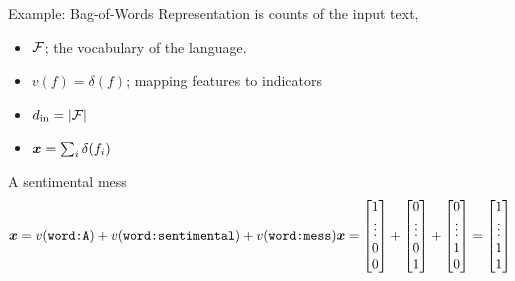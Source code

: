 \documentclass{beamer}
\begin{document}
\begin{frame}{Example: Bag-of-Words}
  Representation is counts of the input text, 
  \begin{itemize}
  \item $\mathcal{F}$; the vocabulary of the language.
  \item $v(f) = \delta(f)$; mapping features to indicators
  \item $d_{\mathrm{in}} = |\mathcal{F}|$
  \item $\boldsymbol{x} = \sum_{i} \delta(f_i)$ 
  \end{itemize}

  A sentimental mess 
  \[  \boldx = v(\texttt{word:A}) + v(\texttt{word:sentimental}) + v(\texttt{word:mess})

  \boldx = 
  \left[ \begin{matrix} 1 \\ \vdots \\ 0\\  0 \\  \end{matrix} \right] + 
  \left[ \begin{matrix} 0 \\ \vdots \\ 0\\ 1 \\  \end{matrix} \right] +
  \left[ \begin{matrix} 0 \\ \vdots \\ 1\\  0 \\  \end{matrix} \right] = 
  \left[ \begin{matrix} 1 \\ \vdots \\ 1 \\ 1 \\  \end{matrix} \right]
  \]
\end{frame}
\end{document}
